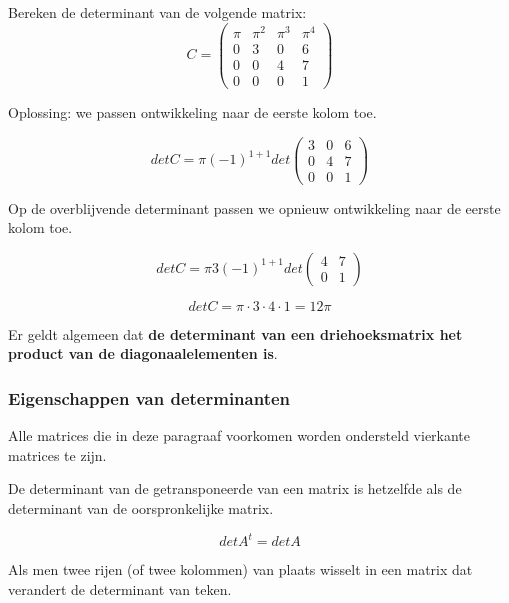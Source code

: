 \begin{voorbeeld}
	Bereken de determinant van de volgende matrix:
	 \[ C=\left( \begin{matrix}
	\pi & \pi^2 & \pi^3 & \pi^4 \\
	0   &  3    &   0   &   6   \\
	0   &  0    &   4   &   7   \\
	0   &  0    &   0   &   1  
	\end{matrix} \right)
	\]
	
	Oplossing: we passen ontwikkeling naar de eerste kolom toe.
	
	\[ det C= \pi (-1)^{1+1} det \left( \begin{matrix}
		3    &   0   &   6   \\
		0    &   4   &   7   \\
		0    &   0   &   1  
	\end{matrix} \right) \]
	
	Op de overblijvende determinant passen we opnieuw ontwikkeling naar de eerste kolom toe.
	
	\[ det C= \pi 3 (-1)^{1+1} det \left( \begin{matrix}
	4 & 7 \\ 0 & 1 
	\end{matrix} \right) \]
	
	\[ det C = \pi\cdot 3\cdot 4\cdot 1 = 12\pi \]
	
	Er geldt algemeen dat {\bf de determinant van een driehoeksmatrix het product van de diagonaalelementen is}. 
\end{voorbeeld}		


\subsubsection{Eigenschappen van determinanten}

Alle matrices die in deze paragraaf voorkomen worden ondersteld vierkante matrices te zijn. 


\begin{eigenschap}
		De determinant van de getransponeerde van een matrix is hetzelfde als de determinant van de oorspronkelijke matrix.
	
	\[ det A^{t}=det A \]
	\end{eigenschap}
	
\begin{eigenschap}
		Als men twee rijen (of twee kolommen) van plaats wisselt in een matrix dat verandert de determinant van teken. 
	\end{eigenschap}
	
